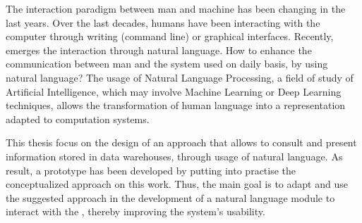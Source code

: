 \begin{abstractotherlanguage}
The interaction paradigm between man and machine has been changing in the last years. Over the last decades, humans have been interacting with the computer through writing (command line) or graphical interfaces. Recently, emerges the interaction through natural language. How to enhance the communication between man and the system used on daily basis, by using natural language? The usage of Natural Language Processing, a field of study of Artificial Intelligence, which may involve Machine Learning or Deep Learning techniques, allows the transformation of human language into a representation adapted to computation systems.

This thesis focus on the design of an approach that allows to consult and present information stored in data warehouses, through usage of natural language. As result, a prototype has been developed by putting into practise the conceptualized approach on this work. Thus, the main goal is to adapt and use the suggested approach in the development of a natural language module to interact with the {\productname}, thereby improving the system's usability.

\end{abstractotherlanguage}